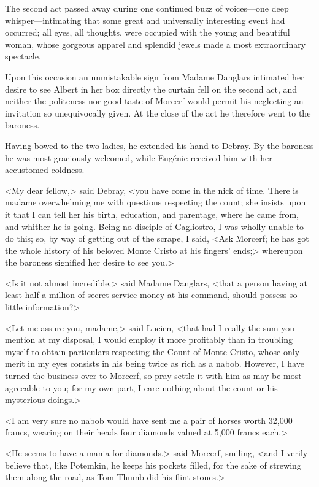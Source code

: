  The second act passed away during one continued buzz of voices—one deep whisper—intimating that some great and universally interesting event had occurred; all eyes, all thoughts, were occupied with the young and beautiful woman, whose gorgeous apparel and splendid jewels made a most extraordinary spectacle. 

 Upon this occasion an unmistakable sign from Madame Danglars intimated her desire to see Albert in her box directly the curtain fell on the second act, and neither the politeness nor good taste of Morcerf would permit his neglecting an invitation so unequivocally given. At the close of the act he therefore went to the baroness. 

 Having bowed to the two ladies, he extended his hand to Debray. By the baroness he was most graciously welcomed, while Eugénie received him with her accustomed coldness. 

 <My dear fellow,> said Debray, <you have come in the nick of time. There is madame overwhelming me with questions respecting the count; she insists upon it that I can tell her his birth, education, and parentage, where he came from, and whither he is going. Being no disciple of Cagliostro, I was wholly unable to do this; so, by way of getting out of the scrape, I said, <Ask Morcerf; he has got the whole history of his beloved Monte Cristo at his fingers' ends;> whereupon the baroness signified her desire to see you.> 

 <Is it not almost incredible,> said Madame Danglars, <that a person having at least half a million of secret-service money at his command, should possess so little information?> 

 <Let me assure you, madame,> said Lucien, <that had I really the sum you mention at my disposal, I would employ it more profitably than in troubling myself to obtain particulars respecting the Count of Monte Cristo, whose only merit in my eyes consists in his being twice as rich as a nabob. However, I have turned the business over to Morcerf, so pray settle it with him as may be most agreeable to you; for my own part, I care nothing about the count or his mysterious doings.>

<I am very sure no nabob would have sent me a pair of horses worth 32,000 francs, wearing on their heads four diamonds valued at 5,000 francs each.> 

 <He seems to have a mania for diamonds,> said Morcerf, smiling, <and I verily believe that, like Potemkin, he keeps his pockets filled, for the sake of strewing them along the road, as Tom Thumb did his flint stones.> 

